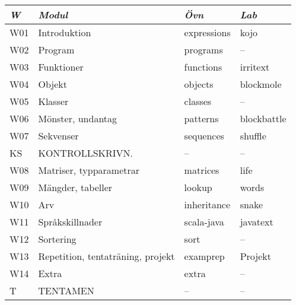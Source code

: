 \begin{tabular}{l|l|l|l}
\textit{W} & \textit{Modul} & \textit{Övn} & \textit{Lab} \\ \hline \hline
W01 & Introduktion & expressions & kojo \\
W02 & Program & programs & -- \\
W03 & Funktioner & functions & irritext \\
W04 & Objekt & objects & blockmole \\
W05 & Klasser & classes & -- \\
W06 & Mönster, undantag & patterns & blockbattle \\
W07 & Sekvenser & sequences & shuffle \\
KS & KONTROLLSKRIVN. & -- & -- \\
W08 & Matriser, typparametrar & matrices & life \\
W09 & Mängder, tabeller & lookup & words \\
W10 & Arv & inheritance & snake \\
W11 & Språkskillnader & scala-java & javatext \\
W12 & Sortering & sort & -- \\
W13 & Repetition, tentaträning, projekt & examprep & Projekt \\
W14 & Extra & extra & -- \\
T & TENTAMEN & -- & -- \\
\end{tabular}
